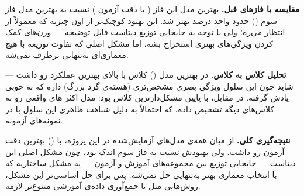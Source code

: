 \documentclass[a4paper,11pt]{article}
\begin{document}
\textbf{مقایسه با فازهای قبل.}
بهترین مدل این فاز ( با دقت آزمون ) نسبت به بهترین مدل فاز سوم () حدود  واحد درصد بهتر شد. این بهبود کوچیک‌تر از اون چیزیه که معمولاً از  انتظار می‌ره؛ ولی با توجه به جابجایی توزیع دیتاست قابل توضیحه — وزن‌های  کمک کردن ویژگی‌های بهتری استخراج بشه، اما مشکل اصلی که تفاوت توزیعه با هیچ معماری‌ای به‌تنهایی برطرف نمی‌شه.

\textbf{تحلیل کلاس به کلاس.}
در بهترین مدل () کلاس  با  بالای  بهترین عملکرد رو داشت — شاید چون این سلول ویژگی بصری مشخص‌تری (هسته‌ی گرد بزرگ) داره که  به خوبی یادش گرفته. در مقابل،  با  پایین  مشکل‌دارترین کلاس بود: مدل اکثر های واقعی رو به کلاس‌های دیگه تشخیص داده، که احتمالاً به دلیل شباهت ظاهری این سلول با  در نمونه‌های آزمونه.

\textbf{نتیجه‌گیری کلی.}
از میان همه‌ی مدل‌های آزمایش‌شده در این پروژه،  با  () بهترین دقت آزمون رو داشت. ولی بهبودش نسبت به فاز سوم اندک بود، چون مشکل اصلی این دیتاست — جابجایی توزیع بین مجموعه‌های آموزش و آزمون — یه مشکل ساختاریه که با انتخاب معماری بهتر به‌تنهایی حل نمی‌شه. پس برای حل اساسی‌تر این مشکل، روش‌هایی مثل  یا جمع‌آوری داده‌ی آموزشی متنوع‌تر لازمه.
\end{document}
